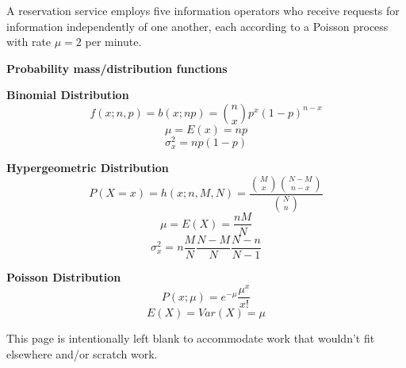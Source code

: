 \documentclass[letterpaper,12pt,addpoints]{exam}
\begin{document}
\begin{questions}

\clearpage
\question A reservation service employs five information operators who receive requests for information independently of one another, each according to a Poisson process with rate $\mu=2$ per minute.

\end{questions}
\clearpage

\centering \textbf{\large Probability mass/distribution functions}

\flushleft \textbf{Binomial Distribution}
$$f(x;n,p)=b(x;np)=\binom{n}{x}p^x(1-p)^{n-x}$$
$$\mu=E(x)=np$$
$$\sigma^2_x=np(1-p)$$

\flushleft \textbf{Hypergeometric Distribution}
$$P(X=x)=h(x;n,M,N)=\frac{\binom{M}{x}\binom{N-M}{n-x}}{\binom{N}{n}}$$
$$\mu=E(X)=\frac{nM}{N}$$
$$\sigma^2_x=n\frac{M}{N}\frac{N-M}{N}\frac{N-n}{N-1}$$

\flushleft \textbf{Poisson Distribution}
$$P(x;\mu)=e^{-\mu}\frac{\mu^x}{x!}$$
$$E(X)=Var(X)=\mu$$

\clearpage
This page is intentionally left blank to accommodate work that wouldn't fit elsewhere and/or scratch work.
\end{document}
